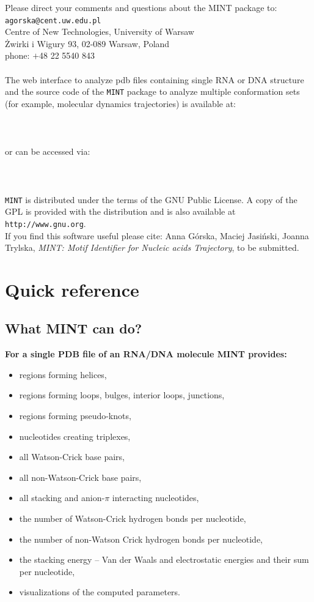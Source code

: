 \documentclass[12pt]{article}
\begin{document}
\noindent
Please direct your comments and questions about the MINT package to:\\
{\tt{agorska@cent.uw.edu.pl}}\\
Centre of New Technologies,
University of Warsaw\\
\.{Z}wirki i Wigury 93, 02-089 Warsaw, Poland\\
phone:  $+$48 22 5540 843 \\ 
\\
The web interface to analyze pdb files containing single RNA or DNA structure and the source code of the {\tt MINT} package to analyze multiple conformation sets (for example, molecular dynamics trajectories) is available at:\\
\\
{}\\
\\
\noindent
or can be accessed via:\\
\\ 
{}\\
\\
{\tt MINT} is distributed under the terms of the GNU Public License. 
A copy of the GPL is provided with the distribution and is also available at {\color{Blue}\tt{http://www.gnu.org}}. \\

\noindent
If you find this software useful please cite: Anna G\'{o}rska, Maciej Jasi\'{n}ski, Joanna Trylska, {\it MINT: Motif Identifier for Nucleic acids Trajectory}, to be submitted. 

\section{Quick reference}
\subsection{What MINT can do?}

\textbf{For a single PDB file of an RNA/DNA molecule MINT provides:}
\begin{itemize}
\item regions forming helices,
\item regions forming loops, bulges, interior loops, junctions,
\item regions forming pseudo-knots,
\item nucleotides creating triplexes,
\item all Watson-Crick base pairs,
\item all non-Watson-Crick base pairs,
\item all stacking and anion-$\pi$ interacting nucleotides,
\item the number of Watson-Crick hydrogen bonds per nucleotide,
\item the number of non-Watson Crick hydrogen bonds per nucleotide,
\item the stacking energy -- Van der Waals and electrostatic energies and their sum per nucleotide,
\item visualizations of the computed parameters.
\end{itemize}
\end{document}
